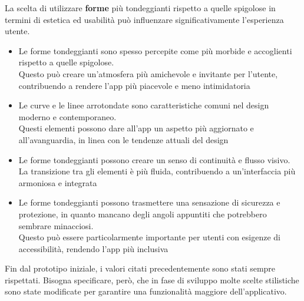 \documentclass{article}
\begin{document}
		La scelta di utilizzare \textbf{forme} più tondeggianti rispetto a quelle spigolose in termini di estetica ed usabilità può influenzare significativamente l'esperienza utente.
		\begin{itemize}
			\item Le forme tondeggianti sono spesso percepite come più morbide e accoglienti rispetto a quelle spigolose.\\ Questo può creare un'atmosfera più amichevole e invitante per l'utente, contribuendo a rendere l'app più piacevole e meno intimidatoria
			\item Le curve e le linee arrotondate sono caratteristiche comuni nel design moderno e contemporaneo. \\Questi elementi possono dare all'app un aspetto più aggiornato e all'avanguardia, in linea con le tendenze attuali del design
			\item Le forme tondeggianti possono creare un senso di continuità e flusso visivo. La transizione tra gli elementi è più fluida, contribuendo a un'interfaccia più armoniosa e integrata
			\item Le forme tondeggianti possono trasmettere una sensazione di sicurezza e protezione, in quanto mancano degli angoli appuntiti che potrebbero sembrare minacciosi. \\Questo può essere particolarmente importante per utenti con esigenze di accessibilità, rendendo l'app più inclusiva
		\end{itemize}
		Fin dal prototipo iniziale, i valori citati precedentemente sono stati sempre rispettati.
		Bisogna specificare, però, che in fase di sviluppo molte scelte stilistiche sono state modificate per garantire una funzionalità maggiore dell'applicativo. 
		\hspace{0.1\textwidth}
\end{document}
